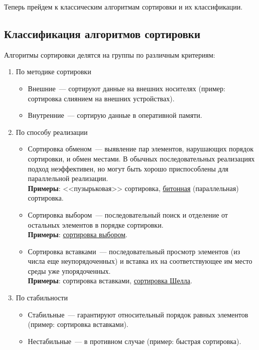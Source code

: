 Теперь прейдем к классическим алгоритмам сортировки и их классификации.
\subsection{Классификация алгоритмов сортировки}
Алгоритмы сортировки делятся на группы по различным критериям:
\begin{enumerate}
  \item По методике сортировки \begin{itemize}
          \item Внешние~--- сортируют данные на внешних носителях (пример: сортировка слиянием на внешних устройствах).
          \item Внутренние~--- сортирую данные в оперативной памяти.
        \end{itemize}
  \item По способу реализации
        \begin{itemize}
          \item Сортировка обменом~--- выявление пар элементов, нарушающих порядок сортировки, и обмен местами.
                В обычных последовательных реализациях подход неэффективен, но могут быть хорошо приспособлены для
                параллельной реализации.\\
                \textbf{Примеры}: <<пузырьковая>> сортировка, \href{https://en.wikipedia.org/wiki/Bitonic_sorter}{битонная} (параллельная) сортировка.
          \item Сортировка выбором~--- последовательный поиск и отделение от остальных элементов в порядке сортировки.\\
                \textbf{Примеры}: \href{https://en.wikipedia.org/wiki/Selection_sort}{сортировка выбором}.
          \item Сортировка вставками~--- последовательный просмотр элементов (из числа еще неупорядоченных) и вставка их
                на соответствующее им место среды уже упорядоченных.\\
                \textbf{Примеры}: сортировка вставками, \href{https://en.wikipedia.org/wiki/Shellsort}{сортировка Шелла}.
        \end{itemize}
  \item По стабильности \begin{itemize}
          \item Стабильные~--- гарантируют относительный порядок равных элементов (пример: сортировка вставками).
          \item Нестабильные~--- в противном случае (пример: быстрая сортировка).

\end{itemize}
\end{enumerate}
